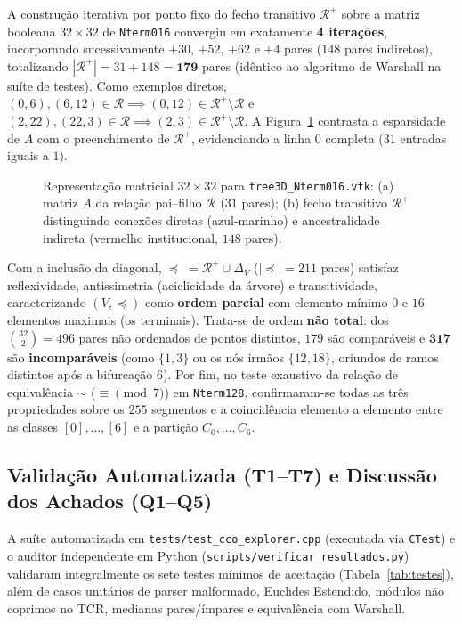\documentclass[11pt, a4paper]{article}
\begin{document}
A construção iterativa por ponto fixo do fecho transitivo $\mathcal{R}^+$ sobre a matriz booleana $32\times 32$ de \texttt{Nterm016} convergiu em exatamente \textbf{4 iterações}, incorporando sucessivamente $+30$, $+52$, $+62$ e $+4$ pares ($148$ pares indiretos), totalizando $|\mathcal{R}^+| = 31 + 148 = \mathbf{179}$ pares (idêntico ao algoritmo de Warshall na suíte de testes). Como exemplos diretos, $(0,6),(6,12) \in \mathcal{R} \implies (0,12) \in \mathcal{R}^+ \setminus \mathcal{R}$ e $(2,22),(22,3) \in \mathcal{R} \implies (2,3) \in \mathcal{R}^+ \setminus \mathcal{R}$. A Figura~\ref{fig:matrizes_d} contrasta a esparsidade de $A$ com o preenchimento de $\mathcal{R}^+$, evidenciando a linha $0$ completa ($31$ entradas iguais a $1$).

\begin{figure}[htbp]
  \centering
  \resizebox{0.90\linewidth}{!}{}
  \caption{Representação matricial $32 \times 32$ para \texttt{tree3D\_Nterm016.vtk}: (a) matriz $A$ da relação pai--filho $\mathcal{R}$ ($31$ pares); (b) fecho transitivo $\mathcal{R}^+$ distinguindo conexões diretas (azul-marinho) e ancestralidade indireta (vermelho institucional, $148$ pares).}
  \label{fig:matrizes_d}
\end{figure}

Com a inclusão da diagonal, $\preceq \; = \mathcal{R}^+ \cup \Delta_V$ ($|\preceq| = 211$ pares) satisfaz reflexividade, antissimetria (aciclicidade da árvore) e transitividade, caracterizando $(V, \preceq)$ como \textbf{ordem parcial} com elemento mínimo $0$ e $16$ elementos maximais (os terminais). Trata-se de ordem \textbf{não total}: dos $\binom{32}{2} = 496$ pares não ordenados de pontos distintos, $179$ são comparáveis e $\mathbf{317}$ são \textbf{incomparáveis} (como $\{1, 3\}$ ou os nós irmãos $\{12, 18\}$, oriundos de ramos distintos após a bifurcação $6$). Por fim, no teste exaustivo da relação de equivalência $\sim$ ($\equiv \pmod 7$) em \texttt{Nterm128}, confirmaram-se todas as três propriedades sobre os $255$ segmentos e a coincidência elemento a elemento entre as classes $[0],\dots,[6]$ e a partição $C_0,\dots,C_6$.

\subsection{Validação Automatizada (T1--T7) e Discussão dos Achados (Q1--Q5)}

A suíte automatizada em \texttt{tests/test\_cco\_explorer.cpp} (executada via \texttt{CTest}) e o auditor independente em Python (\texttt{scripts/verificar\_resultados.py}) validaram integralmente os sete testes mínimos de aceitação (Tabela~\ref{tab:testes}), além de casos unitários de parser malformado, Euclides Estendido, módulos não coprimos no TCR, medianas pares/ímpares e equivalência com Warshall.
\end{document}
